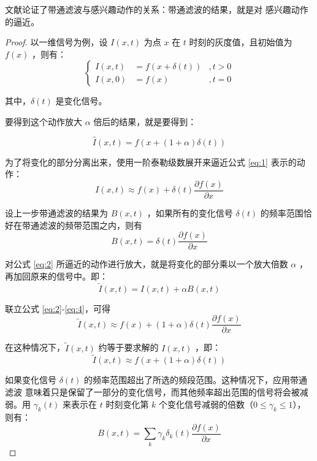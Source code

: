 文献\cite{wu2012eulerian}论证了带通滤波与感兴趣动作的关系：带通滤波的结果，就是对
感兴趣动作的逼近。

\begin{proof}
  以一维信号为例，设 $I(x,t)$ 为点
$x$ 在 $t$ 时刻的灰度值，且初始值为 $f(x)$ ，则有：
\begin{equation}
  \label{eq:1}
  \left\{ \begin{aligned} I(x,t) & = f(x+\delta(t)) & , t >0 \\ I(x,0) & = f(x) &
        , t=0 \end{aligned} \right.
\end{equation}

其中，$\delta(t)$ 是变化信号。

要得到这个动作放大 $\alpha$ 倍后的结果，就是要得到：

\begin{equation}
  \label{eq:2}
  \hat{I}(x,t)=f(x+(1+\alpha)\delta (t))
\end{equation}

为了将变化的部分分离出来，使用一阶泰勒级数展开来逼近公式 \ref{eq:1} 表示的动作：
\begin{equation}
  \label{eq:3}
  I(x,t)\approx f(x)+\delta(t)\frac{\partial f(x)}{\partial x}
\end{equation}

设上一步带通滤波的结果为 $B(x,t)$ ，如果所有的变化信号 $\delta(t)$ 的频率范围恰
好在带通滤波的频带范围之内，则有
\begin{equation}
  \label{eq:4}
  B(x,t)=\delta(t)\frac{\partial f(x)}{\partial x}
\end{equation}

对公式 \ref{eq:2} 所逼近的动作进行放大，就是将变化的部分乘以一个放大倍数
$\alpha$ ，再加回原来的信号中。即：
\begin{equation}
  \label{eq:5}
  \tilde{I}(x,t)=I(x,t)+\alpha B(x,t)
\end{equation}

联立公式 \ref{eq:2}-\ref{eq:4}，可得
\begin{equation}
  \label{eq:6}
  \tilde{I}(x,t)\approx f(x)+(1+\alpha)\delta(t)\frac{\partial f(x)}{\partial x}
\end{equation}

在这种情况下，$\tilde{I}(x,t)$ 约等于要求解的 $I(x,t)$ ，即：
\begin{equation}
  \label{eq:7}
  \tilde{I}(x,t)\approx f(x+(1+\alpha)\delta(t))
\end{equation}

如果变化信号 $\delta(t)$ 的频率范围超出了所选的频段范围。这种情况下，应用带通滤波
意味着只是保留了一部分的变化信号，而其他频率超出范围的信号将会被减弱。用 $\gamma_k(t)$ 来表示在 $t$ 时刻变化第 $k$ 个变化信号减弱的倍数（$0\le \gamma_k \le
1$），则有：
\begin{equation}
    \label{eq:8}
    B(x,t) = \sum_k \gamma_{k}\delta_{k}(t)\frac{\partial f(x)}{\partial x}
\end{equation}


\end{proof}
